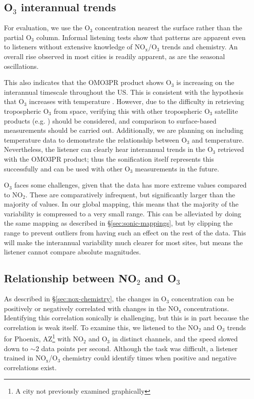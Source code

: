 \documentclass[a4paper,10pt,oneside]{article}
\newcommand{\ce}[1]{$\mathrm{#1}$}
\begin{document}
\begin{sloppy}
\subsection{O$_3$ interannual trends}
For evaluation, we use the \ce{O_3} concentration nearest the surface rather than the partial \ce{O_3} column.  Informal listening tests show that patterns are apparent even to listeners without extensive knowledge of \ce{NO_x}/\ce{O_3} trends and chemistry.  An overall rise observed in most cities is readily apparent, as are the seasonal oscillations. 

This also indicates that the OMO3PR product shows \ce{O_3} is increasing on the interannual timescale throughout the US. This is consistent with the hypothesis that \ce{O_3} increases with temperature \cite{lin17}. However, due to the difficulty in retrieving tropospheric \ce{O_3} from space, verifying this with other tropospheric \ce{O_3} satellite products (e.g. \cite{choi08}) should be considered, and comparison to surface-based measurements should be carried out. Additionally, we are planning on including temperature data to demonstrate the relationship between \ce{O_3} and temperature.  Nevertheless, the listener can clearly hear interannual trends in the \ce{O_3} retrieved with the OMO3PR product; thus the sonification itself represents this successfully and can be used with other \ce{O_3} measurements in the future.

\ce{O_3} faces some challenges, given that the data has more extreme values compared to \ce{NO_2}. These are comparatively infrequent, but significantly larger than the majority of values.  In our global mapping, this means that the majority of the variability is compressed to a very small range. This can be alleviated by doing the same mapping as described in \S\ref{sec:sonic-mappings}, but by clipping the range to prevent outliers from having such an effect on the rest of the data.  This will make the interannual variability much clearer for most sites, but means the listener cannot compare absolute magnitudes. 
 

\subsection{Relationship between NO$_2$ and O$_3$}

	As described in \S\ref{sec:nox-chemistry}, the changes in \ce{O_3} concentration can be positively or negatively correlated with changes in the \ce{NO_x} concentrations. Identifying this correlation sonically is challenging, but this is in part because the correlation is weak itself. To examine this, we listened to the \ce{NO_2} and \ce{O_3} trends for Phoenix, AZ\footnote{A city not previously examined graphically} with \ce{NO_2} and \ce{O_3} in distinct channels, and the speed slowed down to $\sim 2$ data points per second.  Although the task was difficult, a listener trained in \ce{NO_x}/\ce{O_3} chemistry could identify times when positive and negative correlations exist.  
	

\end{sloppy}
\end{document}
